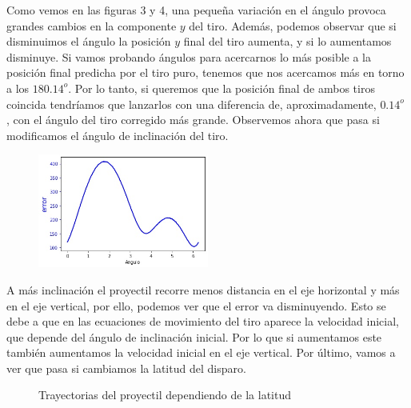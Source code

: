 \documentclass{article}
\begin{document}
Como vemos en las figuras 3 y 4, una pequeña variación en el ángulo provoca grandes cambios en la componente $y$ del tiro. Además, podemos observar que si disminuimos el ángulo la posición $y$ final del tiro aumenta, y si lo aumentamos disminuye.\newline\linebreak
Si vamos probando ángulos para acercarnos lo más posible a la posición final predicha por el tiro puro, tenemos que nos acercamos más en torno a los $180.14^o$. Por lo tanto, si queremos que la posición final de ambos tiros coincida tendríamos que lanzarlos con una diferencia de, aproximadamente, $0.14^o$ , con el ángulo del tiro corregido más grande.\newline\linebreak
Observemos ahora que pasa si modificamos el ángulo de inclinación del tiro.
\begin{figure}[H]
 \centering
   \label{Fig1a}
    \includegraphics[width=0.5\textwidth]{error}
\end{figure}
A más inclinación el proyectil recorre menos distancia en el eje horizontal y más en el eje vertical, por ello, podemos ver que el error va disminuyendo. Esto se debe a que en las ecuaciones de movimiento del tiro aparece la velocidad inicial, que depende del ángulo de inclinación inicial. Por lo que si aumentamos este también aumentamos la velocidad inicial en el eje vertical.\newline\linebreak
Por último, vamos a ver que pasa si cambiamos la latitud del disparo.
\begin{figure}[H]
 \centering
 \caption{Trayectorias del proyectil dependiendo de la latitud}
\label{fig1}
\end{figure}
\end{document}
